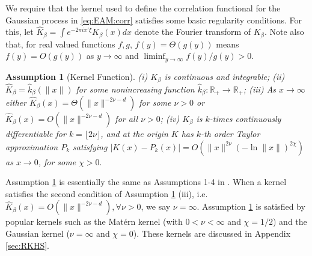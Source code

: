\documentclass[letterpaper,11pt]{article}
\theoremstyle{myplain}
\theoremstyle{mydefinition}
\newtheorem{assumption}{Assumption}[section]
\theoremstyle{myremark}
\renewcommand{\cite}{\citet}
\numberwithin{equation}{section}
\numberwithin{figure}{section}
\begin{document}
\begin{appendix}
We require that the kernel used to define the correlation functional for the Gaussian process in \eqref{eq:EAM:corr} satisfies some basic regularity conditions. For this, let $\hat K_\beta=\int e^{-2\pi i x'\xi}K_\beta(x)dx$ denote the Fourier transform of $K_\beta$. Note also that, for real valued functions $f,g$, $f(y)=\mathit\Theta(g(y))$ means $f(y)=O(g(y))$ as $y\to\infty$ and $\liminf_{y\to\infty}f(y)/g(y)>0$.
\begin{assumption}[Kernel Function]\label{as:kernel}
(i) $K_\beta$ is continuous and integrable; (ii) $\hat K_\beta=\hat k_\beta(\|x\|)$ for some nonincreasing function $\hat k_\beta:\mathbb R_+\to\mathbb R_+$; (iii) As $x\to\infty$ either $\hat K_\beta(x)=\mathit{\Theta}(\|x\|^{-2\nu-d})$ for some $\nu>0$ or $\hat K_\beta(x)=O(\|x\|^{-2\nu-d})$ for all $\nu>0$; (iv) $K_\beta$ is $k$-times continuously differentiable for $k=\lfloor 2\nu\rfloor$, and at the origin $K$ has $k$-th order Taylor approximation $P_k$ satisfying $|K(x)-P_k(x)|=O(\|x\|^{2\nu}(-\ln\|x\|)^{2\chi})$ as $x\to 0$, for some $\chi>0.$
\end{assumption}

Assumption \ref{as:kernel} is essentially the same as Assumptions 1-4 in \cite{Bull_Convergence_2011}.
When a kernel satisfies the second condition of Assumption \ref{as:kernel} (iii), i.e. $\hat K_\beta(x)=O(\|x\|^{-2\nu-d}),\forall\nu>0$, we say $\nu=\infty.$
Assumption \ref{as:kernel} is satisfied by popular kernels such as the Mat\'{e}rn kernel (with $0<\nu<\infty$ and $\chi=1/2$) and the Gaussian kernel ($\nu=\infty$ and $\chi=0$). These kernels are discussed in Appendix \ref{sec:RKHS}.


\end{appendix}
\end{document}
